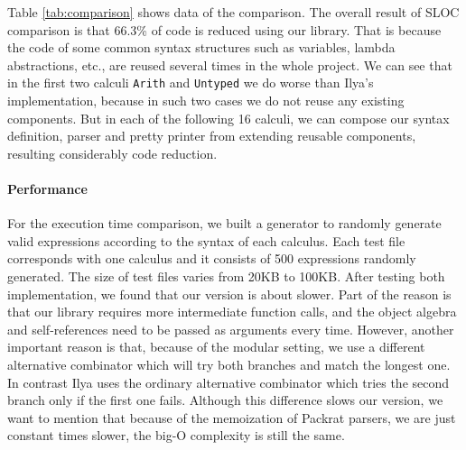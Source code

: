 Table \ref{tab:comparison} shows data of the comparison. The overall
result of SLOC comparison is that 66.3\% of code is reduced using our
library. That is because the code of some common syntax structures
such as variables, lambda abstractions, etc., are reused several times in
the whole project. We can see that in the first two calculi
\lstinline{Arith} and \lstinline{Untyped} we do worse than Ilya's
implementation, because in such two cases we do not reuse any existing
components. But in each of the following 16 calculi, we can compose
our syntax definition, parser and pretty printer from extending
reusable components, resulting considerably code reduction.

\paragraph{Performance}
For the execution time comparison, we built a generator to randomly
generate valid expressions according to the syntax of each calculus.
Each test file corresponds with one calculus and it consists of 500
expressions randomly generated. The size of test files varies from
20KB to 100KB. After testing both implementation, we found that our
version is about  slower. 
 Part of the reason is that our
library requires more intermediate function calls, and the object
algebra and self-references need to be passed as arguments every
time. However, another important reason is that, because of the
modular setting, we use a different alternative combinator which will
try both branches and match the longest one.  In contrast Ilya uses the ordinary alternative combinator
which tries the second branch only if the first one fails. Although
this difference slows our version, we want to mention that because of
the memoization of Packrat parsers, we are just constant times
slower, the big-O complexity is still the same.


